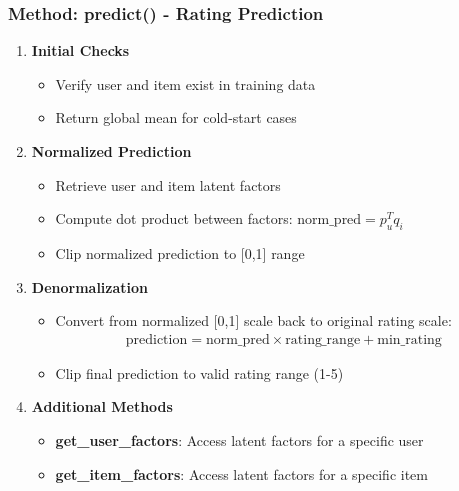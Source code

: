 \documentclass{beamer}
\begin{document}
\begin{frame}
\frametitle{Method: predict() - Rating Prediction}

\begin{enumerate}
    \item \textbf{Initial Checks}
    \begin{itemize}
        \item Verify user and item exist in training data
        \item Return global mean for cold-start cases
    \end{itemize}
    
    \item \textbf{Normalized Prediction}
    \begin{itemize}
        \item Retrieve user and item latent factors
        \item Compute dot product between factors: $\text{norm\_pred} = p_u^T q_i$
        \item Clip normalized prediction to [0,1] range
    \end{itemize}
    
    \item \textbf{Denormalization}
    \begin{itemize}
        \item Convert from normalized [0,1] scale back to original rating scale:
        \begin{align*}
        \text{prediction} = \text{norm\_pred} \times \text{rating\_range} + \text{min\_rating}
        \end{align*}
        \item Clip final prediction to valid rating range (1-5)
    \end{itemize}
    
    \item \textbf{Additional Methods}
    \begin{itemize}
        \item \textbf{get\_user\_factors}: Access latent factors for a specific user
        \item \textbf{get\_item\_factors}: Access latent factors for a specific item
    \end{itemize}
\end{enumerate}
\end{frame}
\end{document}
